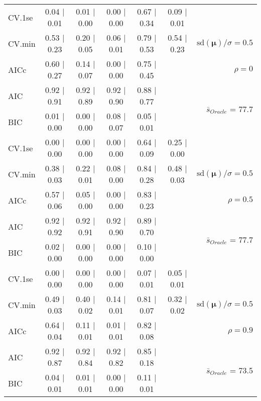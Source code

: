 \begin{table}
\begin{center}
\begin{tabular}{l*{5}{c}|r}
 \hline 
CV.1se & 0.04 $\mid$ 0.01 & 0.01 $\mid$ 0.00 & 0.00 $\mid$ 0.00 & 0.67 $\mid$ 0.34 & 0.09 $\mid$ 0.01 & \\
CV.min & 0.53 $\mid$ 0.23 & 0.20 $\mid$ 0.05 & 0.06 $\mid$ 0.01 & 0.79 $\mid$ 0.53 & 0.54 $\mid$ 0.23 &  $\mathrm{sd}(\mathbf{\mu})/\sigma=0.5$ \\
AICc & 0.60 $\mid$ 0.27 & 0.14 $\mid$ 0.07 & 0.00 $\mid$ 0.00 & 0.75 $\mid$ 0.45 & & $\rho=0$ \\
AIC & 0.92 $\mid$ 0.91 & 0.92 $\mid$ 0.89 & 0.92 $\mid$ 0.90 & 0.88 $\mid$ 0.77 & &  \multirow{2}{*}{$\bar{s}_{Oracle}$ = 77.7} \\
BIC & 0.01 $\mid$ 0.00 & 0.00 $\mid$ 0.00 & 0.08 $\mid$ 0.07 & 0.05 $\mid$ 0.01 & &  \\
 \hline 
CV.1se & 0.00 $\mid$ 0.00 & 0.00 $\mid$ 0.00 & 0.00 $\mid$ 0.00 & 0.64 $\mid$ 0.09 & 0.25 $\mid$ 0.00 & \\
CV.min & 0.38 $\mid$ 0.03 & 0.22 $\mid$ 0.01 & 0.08 $\mid$ 0.00 & 0.84 $\mid$ 0.28 & 0.48 $\mid$ 0.03 &  $\mathrm{sd}(\mathbf{\mu})/\sigma=0.5$ \\
AICc & 0.57 $\mid$ 0.06 & 0.05 $\mid$ 0.00 & 0.00 $\mid$ 0.00 & 0.83 $\mid$ 0.23 & & $\rho=0.5$ \\
AIC & 0.92 $\mid$ 0.92 & 0.92 $\mid$ 0.91 & 0.92 $\mid$ 0.90 & 0.89 $\mid$ 0.70 & &  \multirow{2}{*}{$\bar{s}_{Oracle}$ = 77.7} \\
BIC & 0.02 $\mid$ 0.00 & 0.00 $\mid$ 0.00 & 0.00 $\mid$ 0.00 & 0.10 $\mid$ 0.00 & &  \\
 \hline 
CV.1se & 0.00 $\mid$ 0.00 & 0.00 $\mid$ 0.00 & 0.00 $\mid$ 0.00 & 0.07 $\mid$ 0.01 & 0.05 $\mid$ 0.01 & \\
CV.min & 0.49 $\mid$ 0.03 & 0.40 $\mid$ 0.02 & 0.14 $\mid$ 0.01 & 0.81 $\mid$ 0.07 & 0.32 $\mid$ 0.02 &  $\mathrm{sd}(\mathbf{\mu})/\sigma=0.5$ \\
AICc & 0.64 $\mid$ 0.04 & 0.11 $\mid$ 0.01 & 0.01 $\mid$ 0.01 & 0.82 $\mid$ 0.08 & & $\rho=0.9$ \\
AIC & 0.92 $\mid$ 0.87 & 0.92 $\mid$ 0.84 & 0.92 $\mid$ 0.82 & 0.85 $\mid$ 0.18 & &  \multirow{2}{*}{$\bar{s}_{Oracle}$ = 73.5} \\
BIC & 0.04 $\mid$ 0.01 & 0.01 $\mid$ 0.01 & 0.00 $\mid$ 0.00 & 0.11 $\mid$ 0.01 & &  \\
 \hline 
\end{tabular}
\end{center}
\vspace{-1cm}
\end{table}




